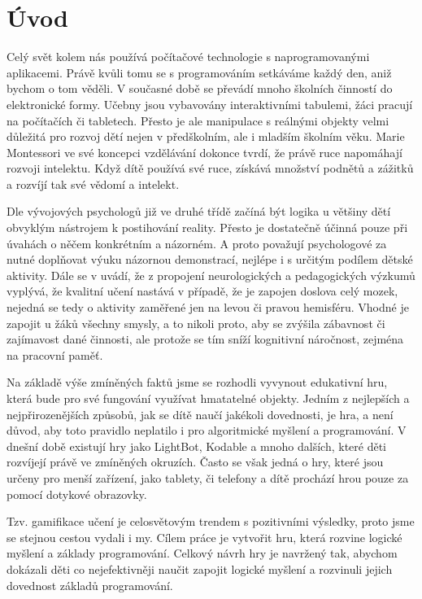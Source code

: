 \chapter{Úvod}

Celý svět kolem nás používá počítačové technologie s naprogramovanými aplikacemi. Právě kvůli tomu se s programováním setkáváme každý den, aniž bychom o tom věděli. V současné době se převádí mnoho školních činností do elektronické formy. Učebny jsou vybavovány interaktivními tabulemi, žáci pracují na počítačích či tabletech. Přesto je ale manipulace s reálnými objekty velmi důležitá pro rozvoj dětí nejen v předškolním, ale i mladším školním věku. Marie Montessori ve své koncepci vzdělávání dokonce tvrdí, že právě ruce napomáhají rozvoji intelektu. Když dítě používá své ruce, získává množství podnětů a zážitků a rozvíjí tak své vědomí a intelekt.\cite{Montessori}
\par
Dle vývojových psychologů\cite{VyvojovaPsychologie} již ve druhé třídě začíná být logika u většiny dětí obvyklým nástrojem k postihování reality. Přesto je dostatečně účinná pouze při úvahách o něčem konkrétním a názorném. A proto považují psychologové za nutné doplňovat výuku názornou demonstrací, nejlépe i s určitým podílem dětské aktivity. Dále se v \cite{ASE} uvádí, že z propojení neurologických a pedagogických výzkumů vyplývá, že kvalitní učení nastává v případě, že je zapojen doslova celý mozek, nejedná se tedy o aktivity zaměřené jen na levou či pravou hemisféru. Vhodné je zapojit u žáků všechny smysly, a to nikoli proto, aby se zvýšila zábavnost či zajímavost dané činnosti, ale protože se tím sníží kognitivní náročnost, zejména na pracovní paměť.
\par
Na základě výše zmíněných faktů jsme se rozhodli vyvynout edukativní hru, která bude pro své fungování využívat hmatatelné objekty. Jedním z nejlepších a nejpřirozenějších způsobů, jak se dítě naučí jakékoli dovednosti, je hra, a není důvod, aby toto pravidlo neplatilo i pro algoritmické myšlení a programování. V dnešní době existují hry jako LightBot, Kodable a mnoho dalších, které děti rozvíjejí právě ve zmíněných okruzích. Často se však jedná o hry, které jsou určeny pro menší zařízení, jako tablety, či telefony a dítě prochází hrou pouze za pomocí dotykové obrazovky.
\par
Tzv. gamifikace učení je celosvětovým trendem s pozitivními výsledky, proto jsme se stejnou cestou vydali i my. Cílem práce je vytvořit hru, která rozvine logické myšlení a základy programování. Celkový návrh hry je navržený tak, abychom dokázali děti co nejefektivněji naučit zapojit logické myšlení a rozvinuli jejich dovednost základů programování.